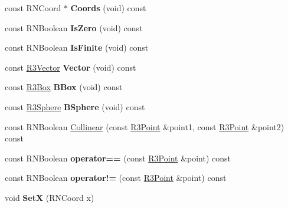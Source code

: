 \begin{DoxyCompactItemize}
\item 
const R\+N\+Coord $\ast$ {\bfseries Coords} (void) const \hypertarget{class_r3_point_aa6986935de2cbfb65ca83c725def5925}{}\label{class_r3_point_aa6986935de2cbfb65ca83c725def5925}

\item 
const R\+N\+Boolean {\bfseries Is\+Zero} (void) const \hypertarget{class_r3_point_a688590f20a1647b6120da20182cafdea}{}\label{class_r3_point_a688590f20a1647b6120da20182cafdea}

\item 
const R\+N\+Boolean {\bfseries Is\+Finite} (void) const \hypertarget{class_r3_point_aa47adb0d0bf3e5323b409932146ef978}{}\label{class_r3_point_aa47adb0d0bf3e5323b409932146ef978}

\item 
const \hyperlink{class_r3_vector}{R3\+Vector} {\bfseries Vector} (void) const \hypertarget{class_r3_point_a3c0a7d65b83428a4c0dab3eb897105a3}{}\label{class_r3_point_a3c0a7d65b83428a4c0dab3eb897105a3}

\item 
const \hyperlink{class_r3_box}{R3\+Box} {\bfseries B\+Box} (void) const \hypertarget{class_r3_point_a798c0536f235aa335a8636507caf429f}{}\label{class_r3_point_a798c0536f235aa335a8636507caf429f}

\item 
const \hyperlink{class_r3_sphere}{R3\+Sphere} {\bfseries B\+Sphere} (void) const \hypertarget{class_r3_point_a1b00d1ff026e054ae509158150a48385}{}\label{class_r3_point_a1b00d1ff026e054ae509158150a48385}

\item 
const R\+N\+Boolean \hyperlink{class_r3_point_a5a12cb30d9490bb0e8ef66296374806c}{Collinear} (const \hyperlink{class_r3_point}{R3\+Point} \&point1, const \hyperlink{class_r3_point}{R3\+Point} \&point2) const 
\item 
const R\+N\+Boolean {\bfseries operator==} (const \hyperlink{class_r3_point}{R3\+Point} \&point) const \hypertarget{class_r3_point_a8eee023207754f118ea4bfe8181f04f1}{}\label{class_r3_point_a8eee023207754f118ea4bfe8181f04f1}

\item 
const R\+N\+Boolean {\bfseries operator!=} (const \hyperlink{class_r3_point}{R3\+Point} \&point) const \hypertarget{class_r3_point_af26dea708d773f52fcf4a34f6fa0fa79}{}\label{class_r3_point_af26dea708d773f52fcf4a34f6fa0fa79}

\item 
void {\bfseries SetX} (R\+N\+Coord x)\hypertarget{class_r3_point_abdff6c109e089cd866db215bd9a83913}{}\label{class_r3_point_abdff6c109e089cd866db215bd9a83913}


\end{DoxyCompactItemize}
